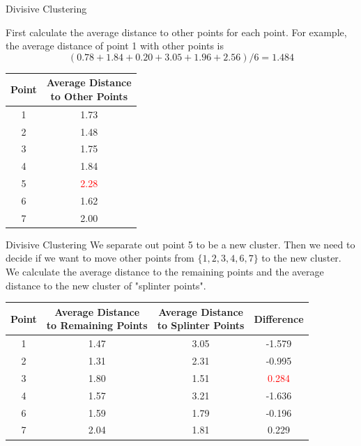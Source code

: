\documentclass{beamer}
\begin{document}
	\begin{frame}{Divisive Clustering}
		
		First calculate the average distance to other points for each point. For example, the average distance of point 1 with other points is
		\[(0.78+1.84+0.20+3.05+1.96+2.56)/6=1.484 \]
		\begin{table}[htbp]
			\centering
			\begin{tabular}{cc}
				\toprule
				Point & \makecell{Average Distance \\ to Other Points}\\
				\midrule
				1 & 1.73 \\
				2 & 1.48 \\
				3 & 1.75 \\ 
				4 & 1.84 \\
				5 & \textcolor{red}{2.28}  \\
				6 & 1.62 \\
				7 & 2.00 \\
				\bottomrule
			\end{tabular}
		\end{table}
		
	\end{frame}
	
	\begin{frame}{Divisive Clustering}
		We separate out point 5 to be a new cluster. Then we need to decide if we want to move other points from $\{1,2,3,4,6,7 \}$ to the new cluster. We calculate the average distance to the remaining points and the average distance to the new cluster of "splinter points".
		
		\begin{table}[htbp]
			\begin{tabular}{cccc}
				\toprule
				Point & \makecell{Average Distance \\ to Remaining Points} & \makecell{Average Distance \\ to Splinter Points} & Difference\\
				\midrule
				1& 1.47 & 3.05 & -1.579\\
				2& 1.31 & 2.31 & -0.995\\
				3& 1.80 & 1.51 & \textcolor{red}{0.284}\\
				4& 1.57& 3.21 & -1.636\\
				6& 1.59 & 1.79 & -0.196\\
				7& 2.04&  1.81 & 0.229\\
				\bottomrule
			\end{tabular}
		\end{table}
	\end{frame}
\end{document}
